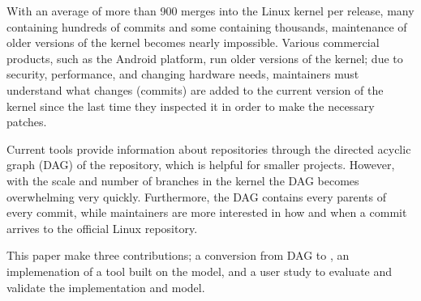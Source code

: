 

With an average of more than 900 merges into the Linux kernel per
release, many containing hundreds of commits and some containing
thousands, maintenance of older versions of the kernel becomes nearly
impossible. Various commercial products, such as the Android platform,
run older versions of the kernel; due to security, performance, and
changing hardware needs, maintainers must understand what changes
(commits) are added to the current version of the kernel since the last
time they inspected it in order to make the necessary patches.

Current tools provide information about repositories through the
directed acyclic graph (DAG) of the repository, which is helpful for
smaller projects. However, with the scale and number of branches in the
kernel the DAG becomes overwhelming very quickly. Furthermore, the DAG
contains every parents of every commit, while maintainers are more
interested in how and when a commit arrives to the official Linux
repository.

This paper make three contributions; a conversion from DAG to \mt, an
implemenation of a tool built on the \mt model, and a user study to
evaluate and validate the implementation and model.

